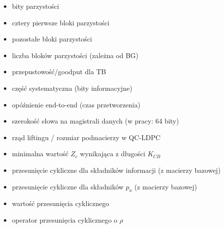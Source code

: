 \begin{itemize}
\item[$p$] bity parzystości
\item[$p_a$] cztery pierwsze bloki parzystości
\item[$p_c$] pozostałe bloki parzystości
\item[$P_B$] liczba bloków parzystości (zależna od BG)
\item[$R_{TB}$] przepustowość/goodput dla TB
\item[$s$] część systematyczna (bity informacyjne)
\item[$T_{E2E}$] opóźnienie end-to-end (czas przetworzenia)
\item[$W$] szerokość słowa na magistrali danych (w pracy: 64 bity)
\item[$Z_c$] rząd liftingu / rozmiar podmacierzy w QC-LDPC
\item[$Z_{c,\min}$] minimalna wartość $Z_c$ wynikająca z długości $K_{CB}$
\item[$\alpha_{t,j}$] przesunięcie cykliczne dla składników informacji (z macierzy bazowej)
\item[$\beta_{t,j}$] przesunięcie cykliczne dla składników $p_a$ (z macierzy bazowej)
\item[$\rho$] wartość przesunięcia cyklicznego
\item[$\mathrm{rot}(\cdot,\rho)$] operator przesunięcia cyklicznego o $\rho$

\end{itemize}
